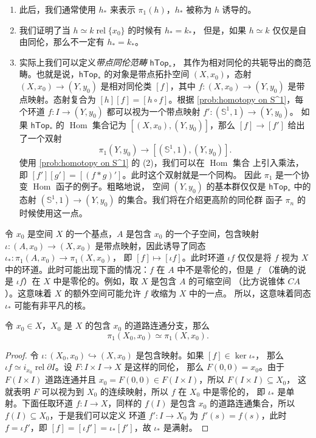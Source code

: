 \documentclass[fontset=none]{Notes}
\DeclareMathOperator\Hom{Hom}
\DeclareMathOperator\rel{rel}
\newcommand{\cat}[1]{\mathsf{#1}}
\newcommand{\partI}{\partial I}
\newcommand{\relhomo}{\rel\partI}
\begin{document}
\begin{remark}
  \begin{enumerate}
    \item 
    此后，我们通常使用 $h_*$ 来表示 $\pi_1(h)$，$h_*$ 被称为 $h$ 诱导的。
    \item 我们证明了当 $h\simeq k\rel\{x_0\}$ 的时候有 $h_*=k_*$，
    但是，如果 $h\simeq k$ 仅仅是自由同伦，那么不一定有 $h_*=k_*$。
    \item 实际上我们可以定义\emph{带点同伦范畴} $\cat{hTop_*}$，
    其作为相对同伦的共轭导出的商范畴。也就是说，$\cat{hTop_*}$
    的对象是带点拓扑空间 $(X,x_0)$，态射 $(X,x_0)\to (Y,y_0)$
    是相对同伦类 $[f]$，其中 $f:(X,x_0)\to (Y,y_0)$
    是带点映射。态射复合为 $[h][f]=[h\circ f]$。根据 
    \ref{prob:homotopy on S^1}，每个环道 $f:I\to (Y,y_0)$
    都可以视为一个带点映射 $f':(\mathbb{S}^1,1)\to (Y,y_0)$。
    如果 $\cat{hTop_*}$ 的 $\Hom$ 集合记为 $[(X,x_0),(Y,y_0)]$，那么
    $[f]\to [f']$ 给出了一个双射
    \[
      \pi_1(Y,y_0)\to [(\mathbb{S}^1,1),(Y,y_0)].
    \]
    使用 \ref{prob:homotopy on S^1} 的 (2)，我们可以在 $\Hom$ 集合
    上引入乘法，即 $[f'][g']=[(f*g)']$。此时这个双射就是一个同构。
    因此 $\pi_1$ 是一个协变 $\Hom$ 函子的例子。粗略地说，
    空间 $(Y,y_0)$ 的基本群仅仅是 $\cat{hTop_*}$ 中的态射 
    $(\mathbb{S}^1,1)\to (Y,y_0)$ 的集合。我们将在介绍更高阶的同伦群
    函子 $\pi_n$ 的时候使用这一点。
  \end{enumerate}  
\end{remark}

令 $x_0$ 是空间 $X$ 的一个基点，$A$ 是包含 $x_0$ 的一个子空间，包含映射
$\iota:(A,x_0)\to (X,x_0)$ 是带点映射，因此诱导了同态 $\iota_*:\pi_1(A,x_0)\to\pi_1(X,x_0)$，
即 $[f]\mapsto [\iota f]$。此时环道 $\iota f$ 仅仅是将 $f$ 视为 $X$ 
中的环道。此时可能出现下面的情况：$f$ 在 $A$ 中不是零伦的，但是 $f$ 
（准确的说是 $\iota f$）在 $X$ 中是零伦的。例如，取 $X$ 是包含 $A$ 的可缩空间
（比方说锥体 $CA$）。这意味着 $X$ 的额外空间可能允许 $f$ 收缩为 $X$ 中的一点。
所以，这意味着同态 $\iota_*$ 可能有非平凡的核。

\begin{theorem}
  令 $x_0\in X$，$X_0$ 是 $X$ 的包含 $x_0$ 的道路连通分支，那么
  \[
    \pi_1(X_0,x_0)\simeq \pi_1(X,x_0).
  \]
\end{theorem}
\begin{proof}
  令 $\iota:(X_0,x_0)\hookrightarrow (X,x_0)$ 是包含映射。如果 $[f]\in\ker\iota_*$，
  那么 $\iota f\simeq i_{x_0}\relhomo$。设 $F:I\times I\to X$ 是这样的同伦，
  那么 $F(0,0)=x_0$。由于 $F(I\times I)$ 道路连通并且 
  $x_0=F(0,0)\in F(I\times I)$，所以 $F(I\times I)\subseteq X_0$，
  这就表明 $F$ 可以视为到 $X_0$ 的连续映射，所以 $f$ 在 $X_0$ 中是零伦的，
  即 $\iota_*$ 是单射。下面任取环道 $f:I\to X$，同样的 $f(I)$
  是包含 $x_0$ 的道路连通集合，所以 $f(I)\subseteq X_0$，于是我们可以定义
  环道 $f':I\to X_0$ 为 $f'(s)=f(s)$，此时 $f=\iota f'$，即
  $[f]=[\iota f']=\iota_*[f']$，故 $\iota_*$ 是满射。
\end{proof}
\end{document}
